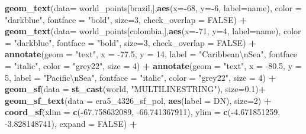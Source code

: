 \documentclass[12pt,twoside]{reedthesis}
\newenvironment{Shaded}{\begin{snugshade}}{\end{snugshade}}
\newcommand{\CharTok}[1]{\textcolor[rgb]{0.31,0.60,0.02}{#1}}
\newcommand{\DataTypeTok}[1]{\textcolor[rgb]{0.13,0.29,0.53}{#1}}
\newcommand{\DecValTok}[1]{\textcolor[rgb]{0.00,0.00,0.81}{#1}}
\newcommand{\FloatTok}[1]{\textcolor[rgb]{0.00,0.00,0.81}{#1}}
\newcommand{\KeywordTok}[1]{\textcolor[rgb]{0.13,0.29,0.53}{\textbf{#1}}}
\newcommand{\NormalTok}[1]{#1}
\newcommand{\OperatorTok}[1]{\textcolor[rgb]{0.81,0.36,0.00}{\textbf{#1}}}
\newcommand{\OtherTok}[1]{\textcolor[rgb]{0.56,0.35,0.01}{#1}}
\newcommand{\StringTok}[1]{\textcolor[rgb]{0.31,0.60,0.02}{#1}}
\begin{document}
\begin{Shaded}
\begin{Highlighting}[]
\StringTok{  }\KeywordTok{geom_text}\NormalTok{(}\DataTypeTok{data=}\NormalTok{ world_points[brazil,],}\KeywordTok{aes}\NormalTok{(}\DataTypeTok{x=}\OperatorTok{-}\DecValTok{68}\NormalTok{, }\DataTypeTok{y=}\OperatorTok{-}\DecValTok{6}\NormalTok{, }\DataTypeTok{label=}\NormalTok{name), }\DataTypeTok{color =} \StringTok{"darkblue"}\NormalTok{, }\DataTypeTok{fontface =} \StringTok{"bold"}\NormalTok{, }\DataTypeTok{size=}\DecValTok{3}\NormalTok{, }\DataTypeTok{check_overlap =} \OtherTok{FALSE}\NormalTok{) }\OperatorTok{+}
\StringTok{  }\KeywordTok{geom_text}\NormalTok{(}\DataTypeTok{data=}\NormalTok{ world_points[colombia,],}\KeywordTok{aes}\NormalTok{(}\DataTypeTok{x=}\OperatorTok{-}\DecValTok{71}\NormalTok{, }\DataTypeTok{y=}\DecValTok{4}\NormalTok{, }\DataTypeTok{label=}\NormalTok{name), }\DataTypeTok{color =} \StringTok{"darkblue"}\NormalTok{, }\DataTypeTok{fontface =} \StringTok{"bold"}\NormalTok{, }\DataTypeTok{size=}\DecValTok{3}\NormalTok{, }\DataTypeTok{check_overlap =} \OtherTok{FALSE}\NormalTok{) }\OperatorTok{+}
\StringTok{  }\KeywordTok{annotate}\NormalTok{(}\DataTypeTok{geom =} \StringTok{"text"}\NormalTok{, }\DataTypeTok{x =} \FloatTok{-77.5}\NormalTok{, }\DataTypeTok{y =} \DecValTok{14}\NormalTok{, }\DataTypeTok{label =} \StringTok{"Caribbean}\CharTok{\textbackslash{}n}\StringTok{Sea"}\NormalTok{, }\DataTypeTok{fontface =} \StringTok{"italic"}\NormalTok{, }\DataTypeTok{color =} \StringTok{"grey22"}\NormalTok{, }\DataTypeTok{size =} \DecValTok{4}\NormalTok{) }\OperatorTok{+}\StringTok{ }
\StringTok{  }\KeywordTok{annotate}\NormalTok{(}\DataTypeTok{geom =} \StringTok{"text"}\NormalTok{, }\DataTypeTok{x =} \FloatTok{-80.5}\NormalTok{, }\DataTypeTok{y =} \DecValTok{5}\NormalTok{, }\DataTypeTok{label =} \StringTok{"Pacific}\CharTok{\textbackslash{}n}\StringTok{Sea"}\NormalTok{, }\DataTypeTok{fontface =} \StringTok{"italic"}\NormalTok{, }\DataTypeTok{color =} \StringTok{"grey22"}\NormalTok{, }\DataTypeTok{size =} \DecValTok{4}\NormalTok{) }\OperatorTok{+}
\StringTok{  }\KeywordTok{geom_sf}\NormalTok{(}\DataTypeTok{data =} \KeywordTok{st_cast}\NormalTok{(world, }\StringTok{"MULTILINESTRING"}\NormalTok{),  }\DataTypeTok{size=}\FloatTok{0.1}\NormalTok{)}\OperatorTok{+}
\StringTok{  }\KeywordTok{geom_sf_text}\NormalTok{(}\DataTypeTok{data =}\NormalTok{ era5_}\DecValTok{4326}\NormalTok{_sf_pol, }\KeywordTok{aes}\NormalTok{(}\DataTypeTok{label =}\NormalTok{ DN), }\DataTypeTok{size=}\DecValTok{2}\NormalTok{) }\OperatorTok{+}
\StringTok{  }\KeywordTok{coord_sf}\NormalTok{(}\DataTypeTok{xlim =} \KeywordTok{c}\NormalTok{(}\OperatorTok{-}\FloatTok{67.758632089}\NormalTok{, }\FloatTok{-66.741367911}\NormalTok{), }\DataTypeTok{ylim =} \KeywordTok{c}\NormalTok{(}\OperatorTok{-}\FloatTok{4.671851259}\NormalTok{, }\FloatTok{-3.828148741}\NormalTok{), }\DataTypeTok{expand =} \OtherTok{FALSE}\NormalTok{) }\OperatorTok{+}

\end{Highlighting}
\end{Shaded}
\end{document}
